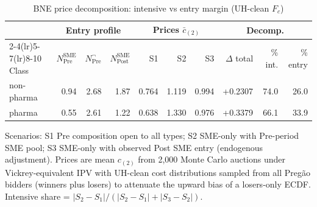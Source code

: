 \begin{table}[htbp]
\centering
\begin{threeparttable}
\caption{BNE price decomposition: intensive vs entry margin (UH-clean $F_c$)}
\label{tab:v3_bne_decomp}
\small
\begin{tabular}{lrrrrrrrrr}
\toprule
 & \multicolumn{3}{c}{Entry profile} & \multicolumn{3}{c}{Prices $\bar c_{(2)}$} & \multicolumn{3}{c}{Decomp.} \\
\cmidrule(lr){2-4}\cmidrule(lr){5-7}\cmidrule(lr){8-10}
Class & $N^{\text{SME}}_{\text{Pre}}$ & $N^{\neg}_{\text{Pre}}$ & $N^{\text{SME}}_{\text{Post}}$ & S1 & S2 & S3 & $\Delta$ total & \% int. & \% entry \\
\midrule
non-pharma & 0.94 & 2.68 & 1.87 & 0.764 & 1.119 & 0.994 & +0.2307 & 74.0 & 26.0 \\
pharma & 0.55 & 2.61 & 1.22 & 0.638 & 1.330 & 0.976 & +0.3379 & 66.1 & 33.9 \\
\bottomrule
\end{tabular}
\begin{tablenotes}\footnotesize
\item Scenarios: S1 Pre composition open to all types; S2 SME-only
with Pre-period SME pool; S3 SME-only with observed Post SME
entry (endogenous adjustment). Prices are mean $c_{(2)}$ from 2{,}000
Monte Carlo auctions under Vickrey-equivalent IPV with UH-clean
cost distributions sampled from all Preg\~ao bidders (winners plus
losers) to attenuate the upward bias of a losers-only ECDF.
Intensive share = $|S_2 - S_1| / (|S_2-S_1| + |S_3-S_2|)$.
\end{tablenotes}
\end{threeparttable}
\end{table}
